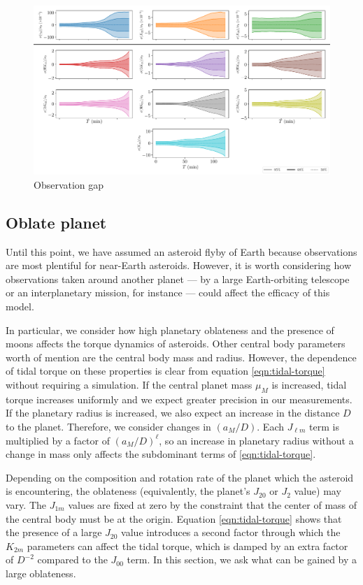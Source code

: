 \documentclass{aastex631}
\begin{document}
\begin{figure}
  \centering
  \includegraphics[width=\textwidth]{observation-gap.pdf}
  \caption{Observation gap}
  \label{fig:observation-gap}
\end{figure}


\subsection{Oblate planet}


Until this point, we have assumed an asteroid flyby of Earth because observations are most plentiful for near-Earth asteroids. However, it is worth considering how observations taken around another planet --- by a large Earth-orbiting telescope or an interplanetary mission, for instance --- could affect the efficacy of this model.

In particular, we consider how high planetary oblateness and the presence of moons affects the torque dynamics of asteroids. Other central body parameters worth of mention are the central body mass and radius. However, the dependence of tidal torque on these properties is clear from equation \ref{eqn:tidal-torque} without requiring a simulation. If the central planet mass $\mu_M$ is increased, tidal torque increases uniformly and we expect greater precision in our measurements. If the planetary radius is increased, we also expect an increase in the distance $D$ to the planet. Therefore, we consider changes in $(a_M/D)$. Each $J_{\ell m}$ term is multiplied by a factor of $(a_M/D)^\ell$, so an increase in planetary radius without a change in mass only affects the subdominant terms of \ref{eqn:tidal-torque}.

Depending on the composition and rotation rate of the planet which the asteroid is encountering, the oblateness (equivalently, the planet's $J_{20}$ or $J_2$ value) may vary. The $J_{1m}$ values are fixed at zero by the constraint that the center of mass of the central body must be at the origin. Equation \ref{eqn:tidal-torque} shows that the presence of a large $J_{20}$ value introduces a second factor through which the $K_{2m}$ parameters can affect the tidal torque, which is damped by an extra factor of $D^{-2}$ compared to the $J_{00}$ term. In this section, we ask what can be gained by a large oblateness.
\end{document}
